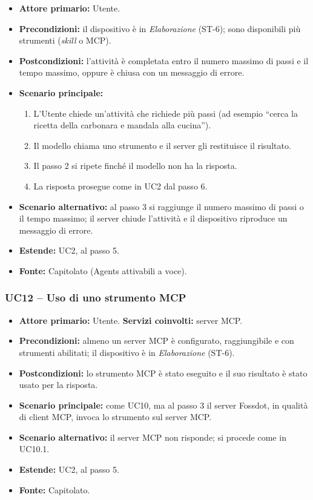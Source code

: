 \documentclass[12pt,a4paper]{article}
\newcommand{\tightlist}{\setlength{\itemsep}{1pt}\setlength{\parskip}{0pt}}
\begin{document}
\begin{itemize}
\tightlist
\item \textbf{Attore primario:} Utente.
\item \textbf{Precondizioni:} il dispositivo è in \emph{Elaborazione} (ST-6); sono disponibili più strumenti (\emph{skill} o MCP).
\item \textbf{Postcondizioni:} l'attività è completata entro il numero massimo di passi e il tempo massimo, oppure è chiusa con un messaggio di errore.
\item \textbf{Scenario principale:}
\begin{enumerate}
\tightlist
\item L'Utente chiede un'attività che richiede più passi (ad esempio ``cerca la ricetta della carbonara e mandala alla cucina'').
\item Il modello chiama uno strumento e il server gli restituisce il risultato.
\item Il passo 2 si ripete finché il modello non ha la risposta.
\item La risposta prosegue come in UC2 dal passo 6.
\end{enumerate}
\item \textbf{Scenario alternativo:} al passo 3 si raggiunge il numero massimo di passi o il tempo massimo; il server chiude l'attività e il dispositivo riproduce un messaggio di errore.
\item \textbf{Estende:} UC2, al passo 5.
\item \textbf{Fonte:} Capitolato (Agents attivabili a voce).
\end{itemize}

\subsubsection{UC12 -- Uso di uno strumento MCP}
\begin{itemize}
\tightlist
\item \textbf{Attore primario:} Utente. \textbf{Servizi coinvolti:} server MCP.
\item \textbf{Precondizioni:} almeno un server MCP è configurato, raggiungibile e con strumenti abilitati; il dispositivo è in \emph{Elaborazione} (ST-6).
\item \textbf{Postcondizioni:} lo strumento MCP è stato eseguito e il suo risultato è stato usato per la risposta.
\item \textbf{Scenario principale:} come UC10, ma al passo 3 il server Fossdot, in qualità di client MCP, invoca lo strumento sul server MCP.
\item \textbf{Scenario alternativo:} il server MCP non risponde; si procede come in UC10.1.
\item \textbf{Estende:} UC2, al passo 5.
\item \textbf{Fonte:} Capitolato.
\end{itemize}
\end{document}

